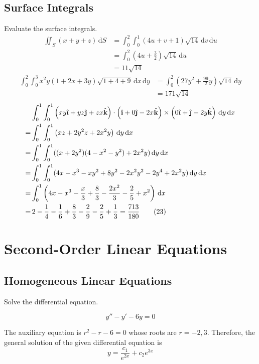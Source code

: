 \documentclass[a4paper,12pt]{article}
\newcommand{\ud}{\,\mathrm{d}}
\newcommand{\unit}[1]{\hat{\textbf #1}}
\begin{document}
\subsection{Surface Integrals}
Evaluate the surface integrals.
\begin{align*}
   \iint_S(x + y + z)\ud S
&= \int_0^2\int_0^1(4u + v + 1)\sqrt{14}\ud v\ud u\\
&= \int_0^2\left(4u + \frac{3}{2}\right)\sqrt{14}\ud u\\
&= 11\sqrt{14} \tag{5}
\end{align*}
\begin{align*}
   \int_0^2\int_0^3 x^2y(1+2x+3y)\sqrt{1 + 4 + 9}\ud x\ud y
&= \int_0^2\left(27y^2 + \frac{99}{2}y\right)\sqrt{14}\ud y\\
&= 171\sqrt{14}\tag{9}
\end{align*}
\begin{align*}
  &\int_0^1\int_0^1\left(xy\unit\i + yz\unit\j + zx\unit k\right)
  \cdot\left(\unit\i + 0\unit\j - 2x\unit k\right)
  \times\left(0\unit\i + \unit\j - 2y\unit k\right)\ud y\ud x\\
= &\int_0^1\int_0^1\left(xz + 2y^2z + 2x^2y\right)\ud y\ud x\\
= &\int_0^1\int_0^1((x + 2y^2)(4 - x^2 - y^2) + 2x^2y)\ud y\ud x\\
= &\int_0^1\int_0^1(4x - x^3 - xy^2 + 8y^2 - 2x^2y^2 - 2y^4 + 2x^2y)\ud y\ud x\\
= &\int_0^1\left(4x - x^3 - \frac{x}{3} + \frac{8}{3}
  - \frac{2x^2}{3} - \frac{2}{5} + x^2\right)\ud x\\
= &\,2 - \frac{1}{4} - \frac{1}{6} + \frac{8}{3}
  - \frac{2}{9} - \frac{2}{5} + \frac{1}{3}
= \frac{713}{180}\tag{23}
\end{align*}

\section{Second-Order Linear Equations}
\subsection{Homogeneous Linear Equations}
Solve the differential equation.

\[y'' - y' - 6y = 0\tag{1}\]

The auxiliary equation is $r^2 - r - 6 = 0$ whose roots are $r = -2, 3$.
Therefore, the general solution of the given differential equation is
\[y = \frac{c_1}{e^{2x}} + c_2 e^{3x}\]
\end{document}
